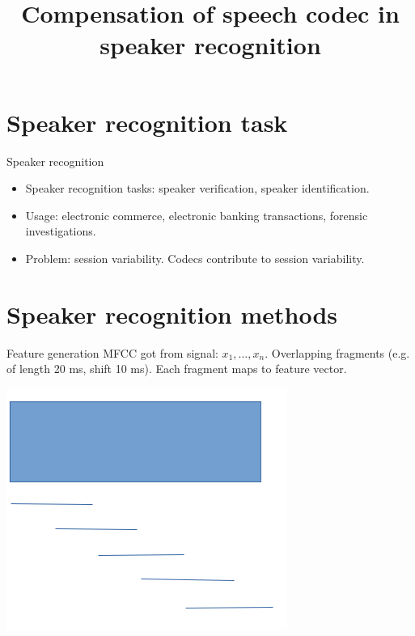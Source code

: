 \documentclass{beamer}
\title[Speech codec in speaker recognition] 
{Compensation of speech codec in speaker recognition}
\begin{document}
\begin{frame}
  \titlepage
\end{frame}


\section{Speaker recognition task}

\begin{frame}{Speaker recognition}
\begin{itemize}
 \item Speaker recognition tasks: speaker verification, speaker identification.
 \item Usage: electronic commerce, electronic banking transactions, forensic investigations. 
 \item Problem: session variability. Codecs contribute to session variability. 
\end{itemize} 
  
\end{frame}

\section{Speaker recognition methods}

\begin{frame}{Feature generation}
MFCC got from signal: $x_1, \ldots, x_n$.
Overlapping fragments (e.g. of length 20 ms, shift 10 ms). 
Each fragment maps to feature vector.


\includegraphics[scale=0.5]{image_mfcc.png}
\end{frame}
\end{document}
